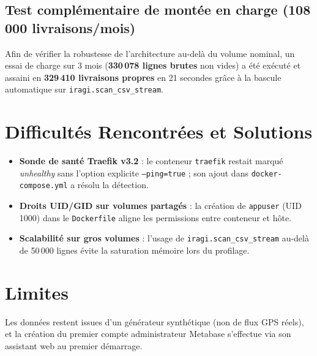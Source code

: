 \documentclass[11pt,a4paper]{article}
\begin{document}
\subsection{Test compl\'ementaire de mont\'ee en charge (108\,000 livraisons/mois)}
Afin de v\'erifier la robustesse de l'architecture au-del\`a du volume nominal, un essai de charge sur 3 mois (\textbf{330\,078 lignes brutes} non vides) a \'et\'e ex\'ecut\'e et assaini en \textbf{329\,410 livraisons propres} en 21 secondes gr\^ace \`a la bascule automatique sur \texttt{iragi.scan\_csv\_stream}.

\section{Difficult\'es Rencontr\'ees et Solutions}
\begin{itemize}
    \item \textbf{Sonde de sant\'e Traefik v3.2} : le conteneur \texttt{traefik} restait marqu\'e \emph{unhealthy} sans l'option explicite \texttt{--ping=true} ; son ajout dans \texttt{docker-compose.yml} a r\'esolu la d\'etection.
    \item \textbf{Droits UID/GID sur volumes partag\'es} : la cr\'eation de \texttt{appuser} (UID 1000) dans le \texttt{Dockerfile} aligne les permissions entre conteneur et h\^ote.
    \item \textbf{Scalabilit\'e sur gros volumes} : l'usage de \texttt{iragi.scan\_csv\_stream} au-del\`a de 50\,000 lignes \'evite la saturation m\'emoire lors du profilage.
\end{itemize}

\section{Limites}
Les donn\'ees restent issues d'un g\'en\'erateur synth\'etique (non de flux GPS r\'eels), et la cr\'eation du premier compte administrateur Metabase s'effectue via son assistant web au premier d\'emarrage.

\end{document}
